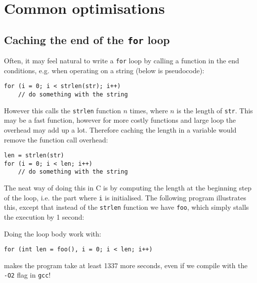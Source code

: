 \section{Common optimisations}

\subsection{Caching the end of the \texttt{for} loop}

Often, it may feel natural to write a \texttt{for} loop by calling a function in the end conditions, e.g. when operating on a string (below is pseudocode):
\begin{verbatim}
for (i = 0; i < strlen(str); i++)
    // do something with the string
\end{verbatim}
However this calls the \texttt{strlen} function $n$ times, where $n$ is the length of \texttt{str}. This may be a fast function, however for more costly functions and large loop the overhead may add up a lot. Therefore caching the length in a variable would remove the function call overhead:
\begin{verbatim}
len = strlen(str)
for (i = 0; i < len; i++)
    // do something with the string
\end{verbatim}

The neat way of doing this in C is by computing the length at the beginning step of the loop, i.e. the part where \texttt{i} is initialised. The following program illustrates this, except that instead of the \texttt{strlen} function we have \texttt{foo}, which simply stalls the execution by 1 second:



Doing the loop body work with:
\begin{verbatim}
for (int len = foo(), i = 0; i < len; i++)
\end{verbatim}
makes the program take at least 1337 more seconds, even if we compile with the \texttt{-O2} flag in \texttt{gcc}!
